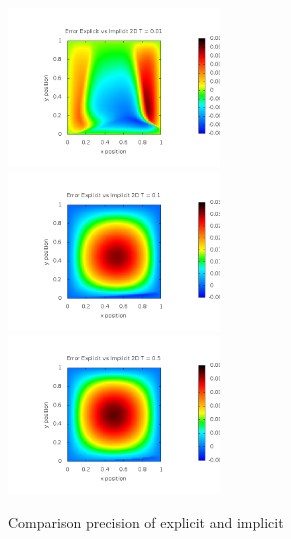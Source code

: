 \documentclass[a4wide,12pt]{article}
\begin{document}
 \begin{figure}[p]
 \includegraphics[width=0.5\textwidth]{ErrorExpVsImp2DT0_01}
 \includegraphics[width=0.5\textwidth]{ErrorExpVsImp2DT0_1}
 \includegraphics[width=0.5\textwidth]{ErrorExpVsImp2DT0_5}
 \caption{Comparison precision of explicit and implicit}
 \label{fig:15}
 \end{figure}
 
\end{document}
